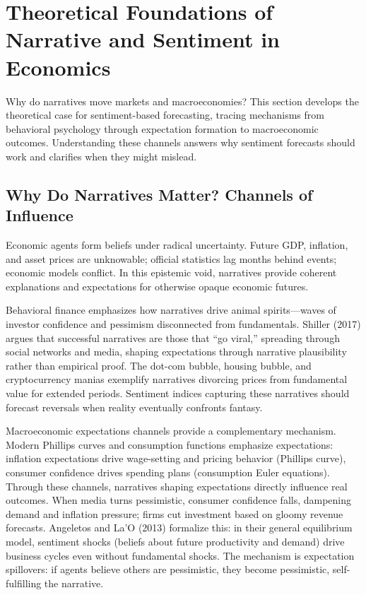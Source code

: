 
\section{Theoretical Foundations of Narrative and Sentiment in Economics}

Why do narratives move markets and macroeconomies? This section develops the theoretical case for sentiment-based forecasting, tracing mechanisms from behavioral psychology through expectation formation to macroeconomic outcomes. Understanding these channels answers why sentiment forecasts should work and clarifies when they might mislead.

\subsection{Why Do Narratives Matter? Channels of Influence}

Economic agents form beliefs under radical uncertainty. Future GDP, inflation, and asset prices are unknowable; official statistics lag months behind events; economic models conflict. In this epistemic void, narratives provide coherent explanations and expectations for otherwise opaque economic futures.

Behavioral finance emphasizes how narratives drive animal spirits---waves of investor confidence and pessimism disconnected from fundamentals. Shiller (2017) argues that successful narratives are those that ``go viral,'' spreading through social networks and media, shaping expectations through narrative plausibility rather than empirical proof. The dot-com bubble, housing bubble, and cryptocurrency manias exemplify narratives divorcing prices from fundamental value for extended periods. Sentiment indices capturing these narratives should forecast reversals when reality eventually confronts fantasy.

Macroeconomic expectations channels provide a complementary mechanism. Modern Phillips curves and consumption functions emphasize expectations: inflation expectations drive wage-setting and pricing behavior (Phillips curve), consumer confidence drives spending plans (consumption Euler equations). Through these channels, narratives shaping expectations directly influence real outcomes. When media turns pessimistic, consumer confidence falls, dampening demand and inflation pressure; firms cut investment based on gloomy revenue forecasts. Angeletos and La'O (2013) formalize this: in their general equilibrium model, sentiment shocks (beliefs about future productivity and demand) drive business cycles even without fundamental shocks. The mechanism is expectation spillovers: if agents believe others are pessimistic, they become pessimistic, self-fulfilling the narrative.

